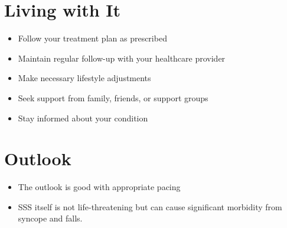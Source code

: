 \section{Living with It}
\begin{itemize}[noitemsep]
  \item Follow your treatment plan as prescribed
  \item Maintain regular follow-up with your healthcare provider
  \item Make necessary lifestyle adjustments
  \item Seek support from family, friends, or support groups
  \item Stay informed about your condition
\end{itemize}
\section{Outlook}
\begin{itemize}[noitemsep]
  \item The outlook is good with appropriate pacing
  \item SSS itself is not life-threatening but can cause significant morbidity from syncope and falls.
\end{itemize}
